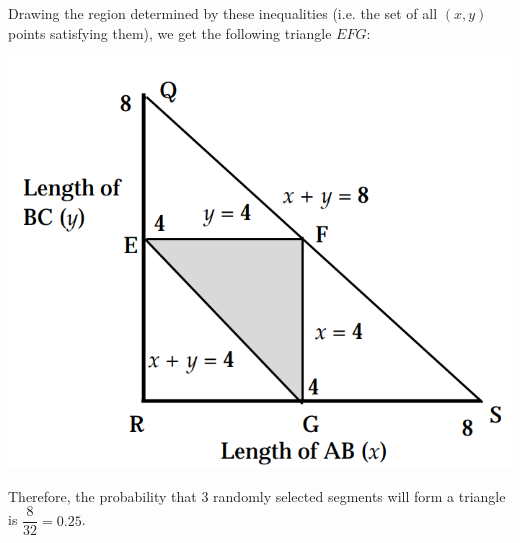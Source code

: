 \begin{solution}
Drawing the region determined by these inequalities (i.e. the set of all $(x,y)$ points satisfying them), we get the following triangle $EFG$:
\begin{center}
    \includegraphics[width=0.36\linewidth]{figs/line3.png}
\end{center}

Therefore, the probability that 3 randomly selected segments will form a triangle is $\dfrac{8}{32}=0.25$.


\end{solution}

